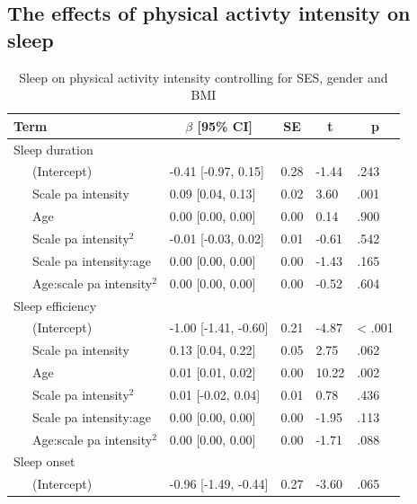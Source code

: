 \documentclass[
  man]{apa6}
\begin{document}
\hypertarget{the-effects-of-physical-activty-intensity-on-sleep}{%
\subsection{The effects of physical activty intensity on sleep}\label{the-effects-of-physical-activty-intensity-on-sleep}}

\begin{table}[tbp]

\begin{center}
\begin{threeparttable}

\caption{\label{tab:sleep-by-intensity}Sleep on physical activity intensity controlling for SES, gender and BMI}

\begin{tabular}{lllll}
\toprule
Term & \multicolumn{1}{c}{$\beta$ [95\% CI]} & \multicolumn{1}{c}{SE} & \multicolumn{1}{c}{t} & \multicolumn{1}{c}{p}\\
\midrule
Sleep duration &  &  &  & \\
\ \ \ (Intercept) & -0.41 [-0.97, 0.15] & 0.28 & -1.44 & .243\\
\ \ \ Scale  pa  intensity & 0.09 [0.04, 0.13] & 0.02 & 3.60 & .001\\
\ \ \ Age & 0.00 [0.00, 0.00] & 0.00 & 0.14 & .900\\
\ \ \ Scale  pa  intensity$^2$ & -0.01 [-0.03, 0.02] & 0.01 & -0.61 & .542\\
\ \ \ Scale  pa  intensity:age & 0.00 [0.00, 0.00] & 0.00 & -1.43 & .165\\
\ \ \ Age:scale  pa  intensity$^2$ & 0.00 [0.00, 0.00] & 0.00 & -0.52 & .604\\
Sleep efficiency &  &  &  & \\
\ \ \ (Intercept) & -1.00 [-1.41, -0.60] & 0.21 & -4.87 & < .001\\
\ \ \ Scale  pa  intensity & 0.13 [0.04, 0.22] & 0.05 & 2.75 & .062\\
\ \ \ Age & 0.01 [0.01, 0.02] & 0.00 & 10.22 & .002\\
\ \ \ Scale  pa  intensity$^2$ & 0.01 [-0.02, 0.04] & 0.01 & 0.78 & .436\\
\ \ \ Scale  pa  intensity:age & 0.00 [0.00, 0.00] & 0.00 & -1.95 & .113\\
\ \ \ Age:scale  pa  intensity$^2$ & 0.00 [0.00, 0.00] & 0.00 & -1.71 & .088\\
Sleep onset &  &  &  & \\
\ \ \ (Intercept) & -0.96 [-1.49, -0.44] & 0.27 & -3.60 & .065\\

\end{tabular}
\end{threeparttable}
\end{center}
\end{table}
\end{document}
